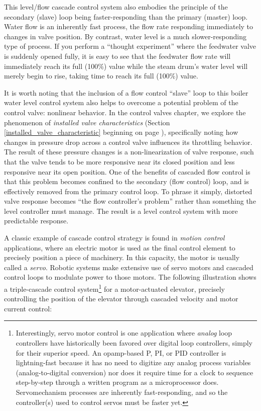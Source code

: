 This level/flow cascade control system also embodies the principle of the secondary (slave) loop being faster-responding than the primary (master) loop.  Water flow is an inherently fast process, the flow rate responding immediately to changes in valve position.  By contrast, water level is a much slower-responding type of process.  If you perform a ``thought experiment'' where the feedwater valve is suddenly opened fully, it is easy to see that the feedwater flow rate will immediately reach its full (100\%) value while the steam drum's water level will merely begin to rise, taking time to reach its full (100\%) value.

\filbreak

It is worth noting that the inclusion of a flow control ``slave'' loop to this boiler water level control system also helps to overcome a potential problem of the control valve: nonlinear behavior.  In the control valves chapter, we explore the phenomenon of \textit{installed valve characteristics} (Section \ref{installed_valve_characteristic} beginning on page \pageref{installed_valve_characteristic}), specifically noting how changes in pressure drop across a control valve influences its throttling behavior.  The result of these pressure changes is a non-linearization of valve response, such that the valve tends to be more responsive near its closed position and less responsive near its open position.  One of the benefits of cascaded flow control is that this problem becomes confined to the secondary (flow control) loop, and is effectively removed from the primary control loop.  To phrase it simply, distorted valve response becomes ``the flow controller's problem'' rather than something the level controller must manage.  The result is a level control system with more predictable response.   

\vskip 10pt

\filbreak

A classic example of cascade control strategy is found in \textit{motion control} applications, where an electric motor is used as the final control element to precisely position a piece of machinery.  In this capacity, the motor is usually called a \textit{servo}.  Robotic systems make extensive use of servo motors and cascaded control loops to modulate power to those motors.  The following illustration shows a triple-cascade control system\footnote{Interestingly, servo motor control is one application where \textit{analog} loop controllers have historically been favored over digital loop controllers, simply for their superior speed.  An opamp-based P, PI, or PID controller is lightning-fast because it has no need to digitize any analog process variables (analog-to-digital conversion) nor does it require time for a clock to sequence step-by-step through a written program as a microprocessor does.  Servomechanism processes are inherently fast-responding, and so the controller(s) used to control servos must be faster yet.} for a motor-actuated elevator, precisely controlling the position of the elevator through cascaded velocity and motor current control:      

